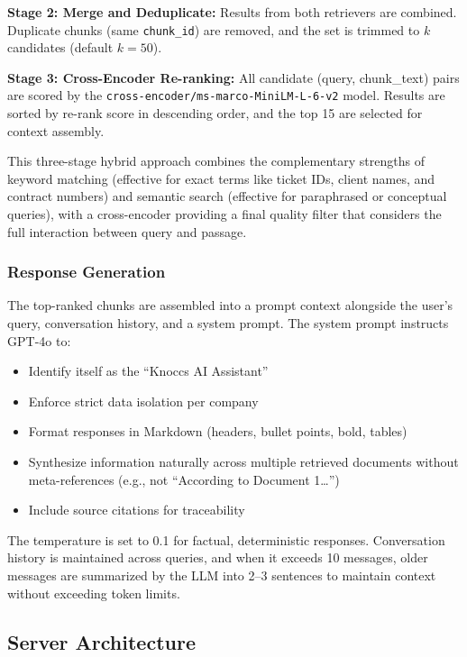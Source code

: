 \textbf{Stage 2: Merge and Deduplicate:} Results from both retrievers are combined. Duplicate chunks (same \texttt{chunk\_id}) are removed, and the set is trimmed to $k$ candidates (default $k = 50$).

\textbf{Stage 3: Cross-Encoder Re-ranking:} All candidate (query, chunk\_text) pairs are scored by the \texttt{cross-encoder/ms-marco-MiniLM-L-6-v2} model. Results are sorted by re-rank score in descending order, and the top 15 are selected for context assembly.

This three-stage hybrid approach combines the complementary strengths of keyword matching (effective for exact terms like ticket IDs, client names, and contract numbers) and semantic search (effective for paraphrased or conceptual queries), with a cross-encoder providing a final quality filter that considers the full interaction between query and passage.

\subsubsection{Response Generation}

The top-ranked chunks are assembled into a prompt context alongside the user's query, conversation history, and a system prompt. The system prompt instructs GPT-4o to:

\begin{itemize}
    \item Identify itself as the ``Knoccs AI Assistant''
    \item Enforce strict data isolation per company
    \item Format responses in Markdown (headers, bullet points, bold, tables)
    \item Synthesize information naturally across multiple retrieved documents without meta-references (e.g., not ``According to Document 1\ldots'')
    \item Include source citations for traceability
\end{itemize}

The temperature is set to 0.1 for factual, deterministic responses. Conversation history is maintained across queries, and when it exceeds 10 messages, older messages are summarized by the LLM into 2--3 sentences to maintain context without exceeding token limits.

\subsection{Server Architecture}

